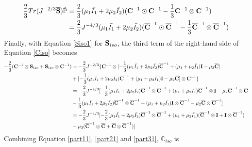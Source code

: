\begin{equation} \label{part21}
\begin{split}
\frac{2}{3}Tr(J^{-2/3}\overline{\bold{S}})\tilde{\mathbb{P}} &= \frac{2}{3}(\mu_1\bar{I_1} + 2\mu_2\bar{I_2})({\bold{C}}^{-1} \odot {\bold{C}}^{-1} - \frac{1}{3}{\bold{C}}^{-1} \otimes {\bold{C}}^{-1}) \\
&= \frac{2}{3}J^{-4/3}(\mu_1\bar{I_1} + 2\mu_2\bar{I_2})({\overline{\bold{C}}}^{-1} \odot {{\overline{\bold{C}}}}^{-1} - \frac{1}{3}{{\overline{\bold{C}}}}^{-1} \otimes {\overline{{\bold{C}}}}^{-1})
\end{split}
\end{equation}
Finally, with Equation \ref{Siso1} for $\bold{S}_{iso}$, the third term of the right-hand side of Equation \ref{Ciso} becomes
\begin{equation} \label{part31}
\begin{split}
- \frac{2}{3}(\bold{C}^{-1}\otimes\bold{S}_{iso} + \bold{S}_{iso}\otimes \bold{C}^{-1})
&=
- \frac{2}{3}J^{-2/3} \{ {\bold{C}}^{-1} \otimes [-\frac{1}{3}(\mu_1\bar{I_1} + 2\mu_2\bar{I_2}){\overline{\bold{C}}}^{-1} + (\mu_1 + \mu_2\bar{I_1})\bold{I} - \mu_2{\overline{\bold{C}}}] \\
&+
[-\frac{1}{3}(\mu_1\bar{I_1} + 2\mu_2\bar{I_2}){\overline{\bold{C}}}^{-1} + (\mu_1 + \mu_2\bar{I_1})\bold{I} - \mu_2{\overline{\bold{C}}}] \otimes {\bold{C}}^{-1}\} \\
&=
- \frac{2}{3}J^{-4/3} [ -\frac{1}{3}(\mu_1\bar{I_1} + 2\mu_2\bar{I_2}) {\overline{\bold{C}}}^{-1} \otimes {\overline{\bold{C}}}^{-1} + (\mu_1 + \mu_2\bar{I_1}){\overline{\bold{C}}}^{-1}\otimes\bold{I} - \mu_2{\overline{\bold{C}}}^{-1} \otimes {\overline{\bold{C}}} \\
&-
\frac{1}{3}(\mu_1\bar{I_1} + 2\mu_2\bar{I_2}) {\overline{\bold{C}}}^{-1} \otimes {\overline{\bold{C}}}^{-1} + (\mu_1 + \mu_2\bar{I_1})\bold{I} \otimes {\overline{\bold{C}}}^{-1} - \mu_2{\overline{\bold{C}}} \otimes {\overline{\bold{C}}}^{-1}] \\
&=
 - \frac{2}{3}J^{-4/3} [ -\frac{2}{3}(\mu_1\bar{I_1} + 2\mu_2\bar{I_2}){\overline{\bold{C}}}^{-1} \otimes {\overline{\bold{C}}}^{-1} + (\mu_1+\mu_2\bar{I_1})({\overline{\bold{C}}}^{-1} \otimes \bold{I} + \bold{I} \otimes {\overline{\bold{C}}}^{-1})\\
&- \mu_2({\overline{\bold{C}}}^{-1} \otimes {\overline{\bold{C}}}+{\overline{\bold{C}}} \otimes {\overline{\bold{C}}}^{-1}) ]
\end{split}
\end{equation}
Combining Equation \ref{part11}, \ref{part21} and \ref{part31}, $\mathbb{C}_{iso}$ is
